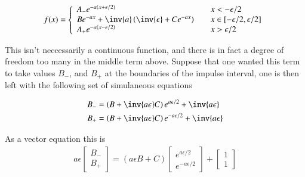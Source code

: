 \documentclass{article}
\begin{document}
\begin{align*}
f(x) = 
\left\{
\begin{array}{l l}
A_{-} e^{-a(x + \epsilon/2)} & \quad x < -\epsilon/2 \\
B e^{-ax} + \inv{a}\left(\inv{\epsilon} + C e^{-a x}\right)& \quad x \in \left[-\epsilon/2, \epsilon/2 \right] \\
A_{+} e^{-a(x - \epsilon/2)} & \quad x > \epsilon/2 \\
\end{array} \right.
\end{align*}


This isn't neccessarily a continuous function, and there is in fact a degree of freedom too many in the middle term above.  Suppose that one wanted this term
to take values $B_{-}$, and $B_{+}$ at the boundaries of the impulse interval, one is then left with the following set of simulaneous equations

\begin{align*}
B_{-} &= \left(B + \inv{a \epsilon } C \right) e^{a \epsilon/2} + \inv{a \epsilon} \\
B_{+} &= \left(B + \inv{a \epsilon } C \right) e^{-a \epsilon/2} + \inv{a \epsilon} \\
\end{align*}

As a vector equation this is
\begin{align*}
a \epsilon
\begin{bmatrix}
B_{-} \\
B_{+} 
\end{bmatrix}
=
\left(a \epsilon B + C \right) 
\begin{bmatrix}
e^{a \epsilon/2} \\
e^{-a \epsilon/2} 
\end{bmatrix}
+
\begin{bmatrix}
1 \\
1
\end{bmatrix}
\end{align*}
\end{document}
